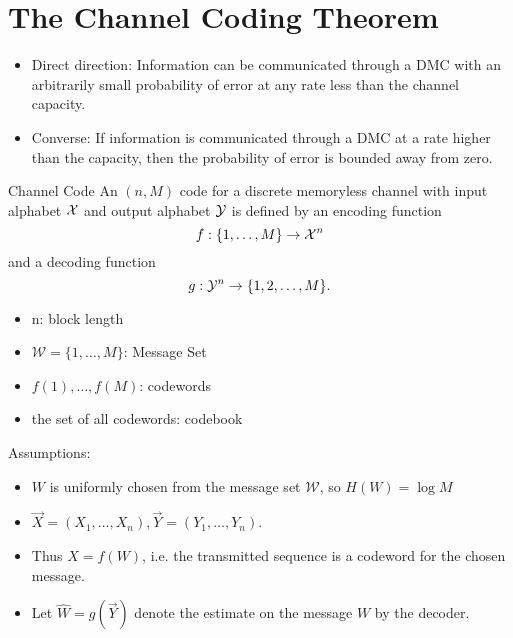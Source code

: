 \documentclass[../main.tex]{subfiles}
\begin{document}
\section{The Channel Coding Theorem}
\begin{itemize}
    \item Direct direction: Information can be communicated through a DMC with an arbitrarily small probability of error at any rate less than the channel capacity.
    \item Converse: If information is communicated through a DMC at a rate higher than the capacity, then the probability of error is bounded away from zero.
\end{itemize}
\begin{gbox}{Channel Code}
    An $(n,M)$ code for a discrete memoryless channel with input alphabet $\mathcal{X}$ and output alphabet $\mathcal{Y}$ is defined by an encoding function\[
    f:\{1,\dots,M\}\to \mathcal{X}^n
    \] 
    and a decoding function
    \[
    g:\mathcal{Y}^n \to \{1,2,\dots,M\}.
    \]
\begin{itemize}
    \item n: block length
    \item $\mathcal{W}=\{1,\dots,M\}$: Message Set
    \item $f(1),\dots,f(M)$: codewords
    \item the set of all codewords: codebook
\end{itemize}
\end{gbox}
Assumptions:
\begin{itemize}
    \item $W$ is uniformly chosen from the message set $\mathcal{W}$, so $H(W)=\log M$
    \item $\vec X=(X_1,...,X_n), \vec Y=(Y_1,\dots,Y_n)$.
    \item Thus $X=f(W)$, i.e. the transmitted sequence is a codeword for the chosen message.
    \item Let $\hat{W}=g(\vec Y)$ denote the estimate on the message $W$ by the decoder.
\end{itemize}
\begin{center}
\end{center}
\end{document}
